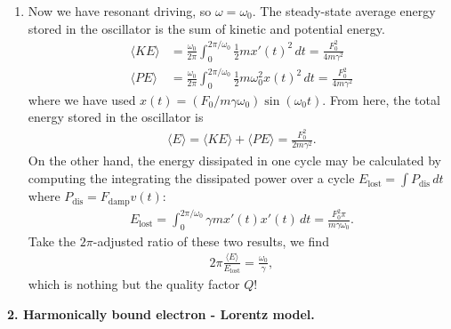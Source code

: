\documentclass{article}
\theoremstyle{definition}
\newcommand{\f}[2]{\frac{#1}{#2}}
\begin{document}
\begin{enumerate}[label= \alph*)]
	\item Now we have resonant driving, so $\omega = \omega_0$. The steady-state average energy stored in the oscillator is the sum of kinetic and potential energy. 
	\begin{align*}
	\langle KE\rangle &= \f{\omega_0}{2\pi} \int_0^{2\pi/\omega_0} \f{1}{2}m x'(t)^2\,dt=   \f{F_0^2 }{4m\gamma^2}\\
	\langle PE \rangle &= \f{\omega_0}{2\pi}\int_0^{2\pi/\omega_0} \f{1}{2}m \omega_0^2 x(t)^2\,dt  = \f{F_0^2}{4m\gamma^2}
	\end{align*}
	where we have used $x(t) = (F_0/m\gamma \omega_0) \sin(\omega_0 t)$. From here, the total energy stored in the oscillator is 
	\begin{align*}
	\langle E \rangle = \langle KE \rangle + \langle PE \rangle = \f{F_0^2}{2m\gamma^2}.
	\end{align*}
	On the other hand, the energy dissipated in one cycle may be calculated by computing the integrating the dissipated power over a cycle $E_\text{lost} = \int P_\text{dis}\,dt$ where $P_\text{dis} = F_\text{damp} v(t)$: 
	\begin{align*}
	E_\text{lost} = \int_0^{2\pi/\omega_0} \gamma m x'(t) x'(t)\,dt = \f{F_0^2 \pi}{m\gamma \omega_0}.
	\end{align*}
	Take the $2\pi$-adjusted ratio of these two results, we find 
	\begin{align*}
	2\pi \f{\langle E \rangle}{E_\text{lost}} = \f{\omega_0}{\gamma},
	\end{align*}
	which is nothing but the quality factor $Q$!
	
\end{enumerate} 



\noindent \textbf{2. Harmonically bound electron - Lorentz model.}
\end{document}
